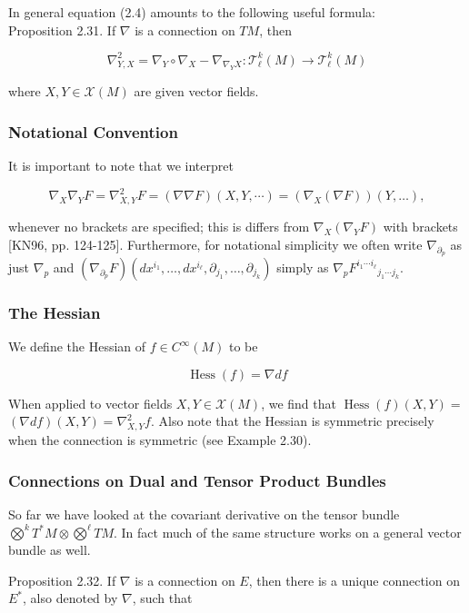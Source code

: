 \documentclass[10pt, letterpaper]{article}
\begin{document}
In general equation (2.4) amounts to the following useful formula:\\
Proposition 2.31. If $\nabla$ is a connection on $T M$, then

$$
\nabla_{Y, X}^{2}=\nabla_{Y} \circ \nabla_{X}-\nabla_{\nabla_{Y} X}: \mathscr{T}_{\ell}^{k}(M) \rightarrow \mathscr{T}_{\ell}^{k}(M)
$$

where $X, Y \in \mathscr{X}(M)$ are given vector fields.

\subsubsection*{Notational Convention}
It is important to note that we interpret

$$
\nabla_{X} \nabla_{Y} F=\nabla_{X, Y}^{2} F=(\nabla \nabla F)(X, Y, \cdots)=\left(\nabla_{X}(\nabla F)\right)(Y, \ldots),
$$

whenever no brackets are specified; this is differs from $\nabla_{X}\left(\nabla_{Y} F\right)$ with brackets [KN96, pp. 124-125]. Furthermore, for notational simplicity we often write $\nabla_{\partial_{p}}$ as just $\nabla_{p}$ and $\left(\nabla_{\partial_{p}} F\right)\left(d x^{i_{1}}, \ldots, d x^{i_{\ell}}, \partial_{j_{1}}, \ldots, \partial_{j_{k}}\right)$ simply as $\nabla_{p} F^{i_{1} \cdots i_{\ell}}{ }_{j_{1} \cdots j_{k}}$.

\subsubsection*{The Hessian}
We define the Hessian of $f \in C^{\infty}(M)$ to be

$$
\operatorname{Hess}(f)=\nabla d f
$$

When applied to vector fields $X, Y \in \mathscr{X}(M)$, we find that $\operatorname{Hess}(f)(X, Y)=$ $(\nabla d f)(X, Y)=\nabla_{X, Y}^{2} f$. Also note that the Hessian is symmetric precisely when the connection is symmetric (see Example 2.30).

\subsubsection*{Connections on Dual and Tensor Product Bundles}
So far we have looked at the covariant derivative on the tensor bundle $\bigotimes^{k} T^{*} M \otimes \bigotimes^{\ell} T M$. In fact much of the same structure works on a general vector bundle as well.

Proposition 2.32. If $\nabla$ is a connection on $E$, then there is a unique connection on $E^{*}$, also denoted by $\nabla$, such that
\end{document}
